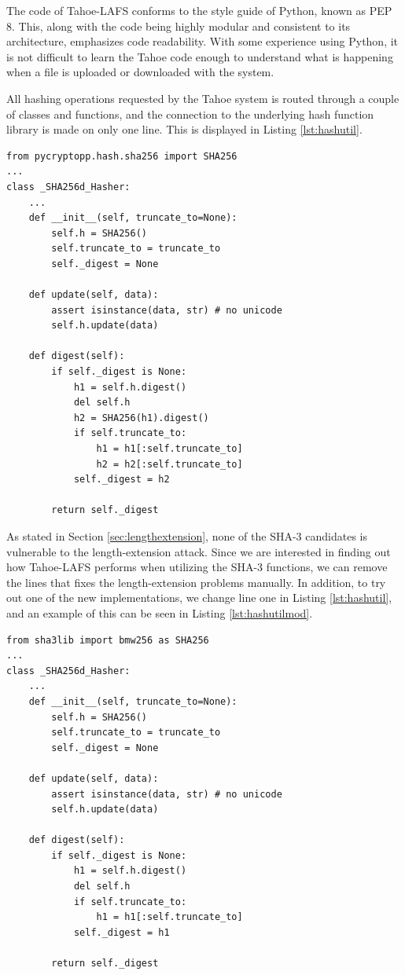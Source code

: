 \documentclass[english,12pt,a4paper]{book}
\begin{document}
The code of Tahoe-LAFS conforms to the style guide of Python, known as PEP 8.
This, along with the code being highly modular and consistent to its
architecture, emphasizes code readability.
With some experience using Python, it is not difficult to learn the Tahoe code
enough to understand what is happening when a file is uploaded or downloaded
with the system.

All hashing operations requested by the Tahoe system is routed through a
couple of classes and functions, and the connection to the underlying hash
function library is made on only one line. This is displayed in Listing
\ref{lst:hashutil}.

\begin{lstlisting}[label=lst:hashutil, caption=Extract from hashutil.py of Tahoe-LAFS source.]
from pycryptopp.hash.sha256 import SHA256
...
class _SHA256d_Hasher:
    ...
    def __init__(self, truncate_to=None):
        self.h = SHA256()
        self.truncate_to = truncate_to
        self._digest = None

    def update(self, data):
        assert isinstance(data, str) # no unicode
        self.h.update(data)

    def digest(self):
        if self._digest is None:
            h1 = self.h.digest()
            del self.h
            h2 = SHA256(h1).digest()
            if self.truncate_to:
                h1 = h1[:self.truncate_to]
                h2 = h2[:self.truncate_to]
            self._digest = h2

        return self._digest
\end{lstlisting}

As stated in Section \ref{sec:lengthextension}, none of the SHA-3 candidates is
vulnerable to the length-extension attack. Since we are interested in finding
out how Tahoe-\ac{LAFS} performs when utilizing the SHA-3 functions, we can
remove the lines that fixes the length-extension problems manually. In addition,
to try out one of the new implementations, we change line one in Listing
\ref{lst:hashutil}, and an example of this can be seen in Listing
\ref{lst:hashutilmod}.

\begin{lstlisting}[label=lst:hashutilmod, caption=Parts of hashutil.py of Tahoe-LAFS source after modification.]
from sha3lib import bmw256 as SHA256
...
class _SHA256d_Hasher:
    ...
    def __init__(self, truncate_to=None):
        self.h = SHA256()
        self.truncate_to = truncate_to
        self._digest = None

    def update(self, data):
        assert isinstance(data, str) # no unicode
        self.h.update(data)

    def digest(self):
        if self._digest is None:
            h1 = self.h.digest()
            del self.h
            if self.truncate_to:
                h1 = h1[:self.truncate_to]
            self._digest = h1

        return self._digest
\end{lstlisting}
\end{document}
